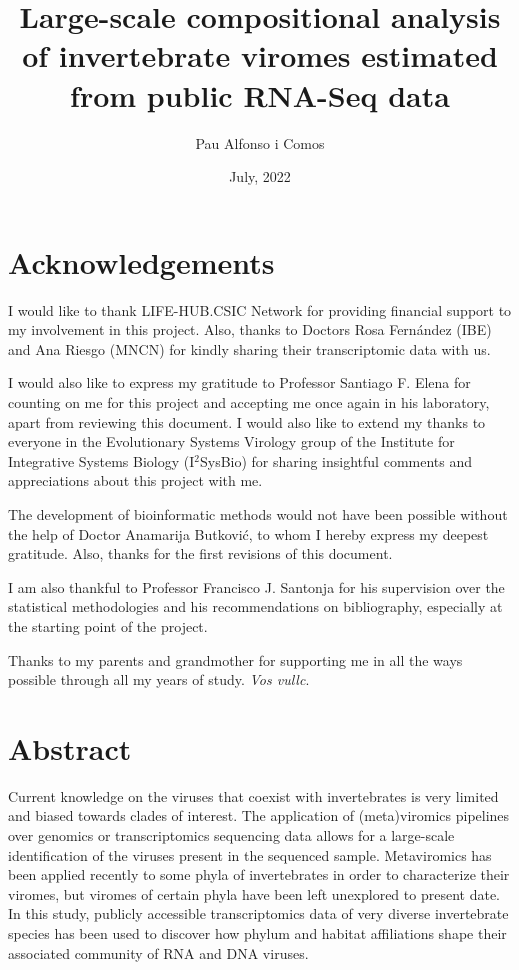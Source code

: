 \documentclass[
  openany]{book}
\title{Large-scale compositional analysis of invertebrate viromes estimated from public RNA-Seq data}
\author{Pau Alfonso i Comos}
\date{July, 2022}
\begin{document}
\maketitle

{
\setcounter{tocdepth}{1}
\tableofcontents
}
\listoftables
\listoffigures
\hypertarget{acknowledgements}{%
\chapter*{Acknowledgements}\label{acknowledgements}}

I would like to thank LIFE-HUB.CSIC Network for providing financial support to my involvement in this project. Also, thanks to Doctors Rosa Fernández (IBE) and Ana Riesgo (MNCN) for kindly sharing their transcriptomic data with us.

I would also like to express my gratitude to Professor Santiago F. Elena for counting on me for this project and accepting me once again in his laboratory, apart from reviewing this document. I would also like to extend my thanks to everyone in the Evolutionary Systems Virology group of the Institute for Integrative Systems Biology (I\(^2\)SysBio) for sharing insightful comments and appreciations about this project with me.

The development of bioinformatic methods would not have been possible without the help of Doctor Anamarija Butković, to whom I hereby express my deepest gratitude. Also, thanks for the first revisions of this document.

I am also thankful to Professor Francisco J. Santonja for his supervision over the statistical methodologies and his recommendations on bibliography, especially at the starting point of the project.

Thanks to my parents and grandmother for supporting me in all the ways possible through all my years of study. \emph{Vos vullc}.

\hypertarget{abstract}{%
\chapter*{Abstract}\label{abstract}}

Current knowledge on the viruses that coexist with invertebrates is very limited and biased towards clades of interest. The application of (meta)viromics pipelines over genomics or transcriptomics sequencing data allows for a large-scale identification of the viruses present in the sequenced sample. Metaviromics has been applied recently to some phyla of invertebrates in order to characterize their viromes, but viromes of certain phyla have been left unexplored to present date. In this study, publicly accessible transcriptomics data of very diverse invertebrate species has been used to discover how phylum and habitat affiliations shape their associated community of RNA and DNA viruses.
\end{document}
